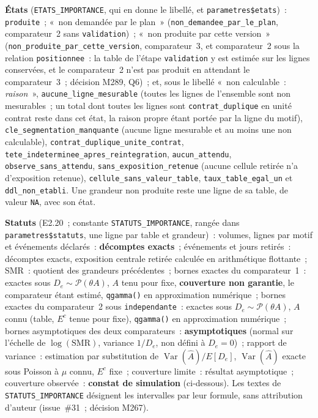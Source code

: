 \documentclass[a4paper,11pt]{article}
\newcommand{\code}[1]{\texttt{\small #1}}
\begin{document}
{\medskip
\noindent
\textbf{États} (\code{ETATS\_IMPORTANCE}, qui en donne le libellé, et
\code{parametres\$etats})~: \code{produite}~; «~non demandée par le plan~»
(\code{non\_demandee\_par\_le\_plan}, comparateur~2 sans \code{validation})~;
«~non produite par cette version~»
(\code{non\_produite\_par\_cette\_version}, comparateur~3, et comparateur~2
sous la relation \code{positionnee}~: la table de l'étape \code{validation}
y est estimée sur les lignes conservées, et le comparateur~2 n'est pas
produit en attendant le comparateur~3~; décision M289, Q6)~; et, sous le
libellé «~non calculable~: \emph{raison}~», \code{aucune\_ligne\_mesurable}
(toutes les lignes de l'ensemble sont non mesurables~; un total dont toutes
les lignes sont \code{contrat\_duplique} en unité contrat reste dans cet
état, la raison propre étant portée par la ligne du motif),
\code{cle\_segmentation\_manquante} (aucune ligne mesurable et au moins une
non calculable), \code{contrat\_duplique\_unite\_contrat},
\code{tete\_indeterminee\_apres\_reintegration}, \code{aucun\_attendu},
\code{observe\_sans\_attendu}, \code{sans\_exposition\_retenue} (aucune
cellule retirée n'a d'exposition retenue), \code{cellule\_sans\_valeur\_table},
\code{taux\_table\_egal\_un} et \code{ddl\_non\_etabli}. Une grandeur non
produite reste une ligne de sa table, de valeur \code{NA}, avec son état.

\medskip
\textbf{Statuts} (E2.20~; constante \code{STATUTS\_IMPORTANCE}, rangée dans
\code{parametres\$statuts}, une ligne par table et grandeur)~: volumes,
lignes par motif et événements déclarés~: \textbf{décomptes exacts}~;
événements et jours retirés~: décomptes exacts, exposition centrale
retirée calculée en arithmétique flottante~; SMR~: quotient des grandeurs
précédentes~; bornes exactes du comparateur~1~: exactes sous $D_e \sim
\mathcal{P}(\theta A)$, $A$ tenu pour fixe, \textbf{couverture non
garantie}, le comparateur étant estimé, \code{qgamma()} en approximation
numérique~; bornes exactes du comparateur~2 sous \code{independante}~:
exactes sous $D_e \sim \mathcal{P}(\theta A)$, $A$ connu (table, $E^c$
tenue pour fixe), \code{qgamma()} en approximation numérique~; bornes
asymptotiques des deux comparateurs~: \textbf{asymptotiques} (normal sur
l'échelle de $\log(\mathrm{SMR})$, variance $1/D_e$, non défini à $D_e =
0$)~; rapport de variance~: estimation par substitution de
$\operatorname{Var}(\hat A)/E[D_e]$, $\operatorname{Var}(\hat A)$ exacte
sous Poisson à $\mu$ connu, $E^c$ fixe~; couverture limite~: résultat
asymptotique~; couverture observée~: \textbf{constat de simulation}
(ci-dessous). Les textes de \code{STATUTS\_IMPORTANCE} désignent les
intervalles par leur formule, sans attribution d'auteur (issue~\#31~;
décision M267).

}
\end{document}
